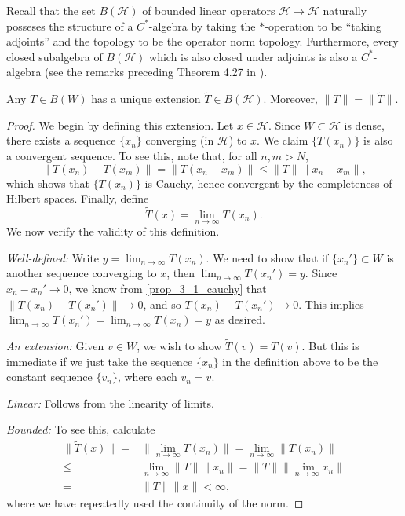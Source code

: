 \documentclass[12pt]{article}
\begin{document}
Recall that the set $B(\mathcal{H})$ of bounded linear operators $\mathcal{H}\to\mathcal{H}$ naturally posseses the structure of a $C^\ast$-algebra by taking the $\ast$-operation to be ``taking adjoints'' and the topology to be the operator norm topology. Furthermore, every closed subalgebra of $B(\mathcal{H})$ which is also closed under adjoints is also a $C^\ast$-algebra (see the remarks preceding Theorem 4.27 in \cite{douglas_1998}). 

\begin{proposition}
\label{prop_extension}
	Any $T\in B(W)$ has a unique extension $\tilde{T}\in B(\mathcal{H})$. Moreover, $\|T\|=\|\tilde{T}\|$.
\end{proposition}
\begin{proof}
	We begin by defining this extension. Let $x\in\mathcal{H}$. Since $W\subset\mathcal{H}$ is dense, there exists a sequence $\{x_n\}$ converging (in $\mathcal{H}$) to $x$. We claim $\{T(x_n)\}$ is also a convergent sequence. To see this, note that, for all $n,m>N$,
	\begin{equation*}
	\label{prop_3_1_cauchy}
		\|T(x_n) - T(x_m)\|=\|T(x_n-x_m)\|\leq\|T\|\|x_n-x_m\|,
	\end{equation*}
	which shows that $\{T(x_n)\}$ is Cauchy, hence convergent by the completeness of Hilbert spaces. Finally, define 
	\begin{equation*}
		\tilde{T}(x) = \lim_{n\to\infty}T(x_n).
	\end{equation*}
	We now verify the validity of this definition.

	\textit{Well-defined:} Write $y=\lim_{n\to\infty} T(x_n)$. We need to show that if $\{x_n'\}\subset W$ is another sequence converging to $x$, then $\lim_{n\to\infty}T(x_n')=y$. Since $x_n-x_n'\to 0$, we know from \ref{prop_3_1_cauchy} that $\|T(x_n)-T(x_n')\|\to 0$, and so $T(x_n)-T(x_n')\to 0$. This implies $\lim_{n\to\infty}T(x_n')=\lim_{n\to\infty}T(x_n)=y$ as desired.

	\textit{An extension:} Given $v\in W$, we wish to show $\tilde{T}(v)=T(v)$. But this is immediate if we just take the sequence $\{x_n\}$ in the definition above to be the constant sequence $\{v_n\}$, where each $v_n=v$.

	\textit{Linear:} Follows from the linearity of limits.

	\textit{Bounded:} To see this, calculate
	\begin{align*}
		\|\tilde{T}(x)\| =& \|\lim_{n\to\infty}T(x_n)\| = \lim_{n\to\infty} \|T(x_n)\| \\
		\leq& \lim_{n\to\infty} \|T\|\|x_n\| = \|T\|\|\lim_{n\to\infty} x_n\| \\
		=& \|T\|\|x\| < \infty,
	\end{align*}
	where we have repeatedly used the continuity of the norm.


\end{proof}
\end{document}
